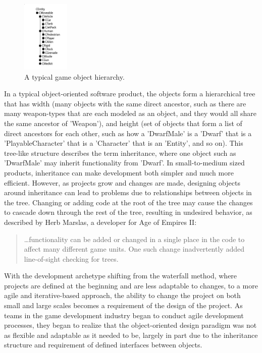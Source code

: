 \begin{figure}[h!]
  \centering \includegraphics[width=0.2\textwidth]{Images/tree}
  \caption{A typical game object hierarchy. \cite{west2006evolve}}
\end{figure}

In a typical object-oriented software product, the objects form a hierarchical tree that has width (many objects with the same direct ancestor, such as there are many weapon-types that are each modeled as an object, and they would all share the same ancestor of 'Weapon'), and height (set of objects that form a list of direct ancestors for each other, such as how a 'DwarfMale' is a 'Dwarf' that is a 'PlayableCharacter' that is a 'Character' that is an 'Entity', and so on). This tree-like structure describes the term inheritance, where one object such as 'DwarfMale' may inherit functionality from 'Dwarf'. In small-to-medium sized products, inheritance can make development both simpler and much more efficient. However, as projects grow and changes are made, designing objects around inheritance can lead to problems due to relationships between objects in the tree. Changing or adding code at the root of the tree may cause the changes to cascade down through the rest of the tree, resulting in undesired behavior, as described by Herb Marslas, a developer for Age of Empires II:

\begin{quote}
\ldots functionality can be added or changed in a single place in the code to affect many different game units. One such change inadvertently added line-of-sight checking for trees\cite{wilson2003game}.
\end{quote}

With the development archetype shifting from the waterfall method, where projects are defined at the beginning and are less adaptable to changes, to a more agile and iterative-based approach, the ability to change the project on both small and large scales becomes a requirement of the design of the project. As teams in the game development industry began to conduct agile development processes, they began to realize that the object-oriented design paradigm was not as flexible and adaptable as it needed to be, largely in part due to the inheritance structure and requirement of defined interfaces between objects.

